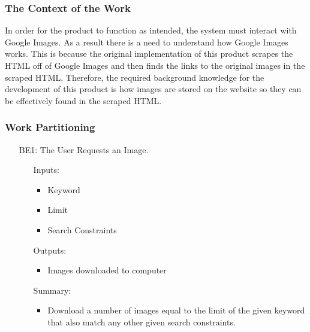 \documentclass[12pt, titlepage]{article}
\begin{document}
\subsubsection{The Context of the Work}

In order for the product to function as intended, the system must interact with Google Images. As a result there is a need to understand how Google Images works. This is because the original implementation of this product scrapes the HTML off of Google Images and then finds the links to the original images in the scraped HTML. Therefore, the required background knowledge for the development of this product is how images are stored on the website so they can be effectively found in the scraped HTML. 

\subsubsection{Work Partitioning}

\begin{enumerate}
    \item [BE1:] The User Requests an Image.
        \begin{itemize}[wide=0pt, leftmargin=*]
            \item [Inputs:] \phantom{empty}
                \begin{itemize} [wide=0pt, leftmargin=*]
                    \item Keyword
                    \item Limit
                    \item Search Constraints
                \end{itemize}
                
            \item [Outputs:] \phantom{empty}
                \begin{itemize} [wide=0pt, leftmargin=*]
                    \item Images downloaded to computer
                \end{itemize}
            \item [Summary:] \phantom{empty}
                \begin{itemize} [wide=0pt, leftmargin=*]
                    \item Download a number of images equal to the limit of the given keyword that also match any other given search constraints.
                \end{itemize}
        \end{itemize}
\end{enumerate}
\end{document}
